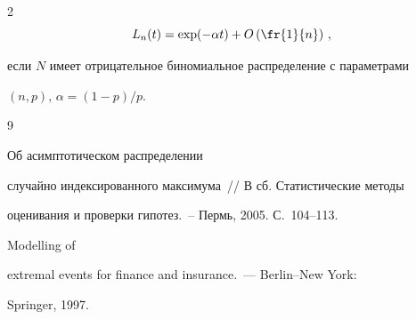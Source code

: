 \begin{multicols}{2}
$$


L_n(t)=\exp(-\alpha t)+O\left(\fr{1}{n}\right)\,,


$$ 


если $N$ имеет отрицательное биномиальное распределение с параметрами 


$(n,p), \,  \alpha=(1-p)/p$.





{\small\frenchspacing


{%




\begin{thebibliography}{9}









Об асимптотическом распределении


случайно индексированного максимума~// В сб. Статистические методы


оценивания и проверки гипотез.~-- Пермь, 2005. С.~104--113.





\label{end\stat}









Modelling of


extremal events for finance and insurance.~--- Berlin--New York:


Springer, 1997.


\end{thebibliography}





} 


}


\end{multicols}


